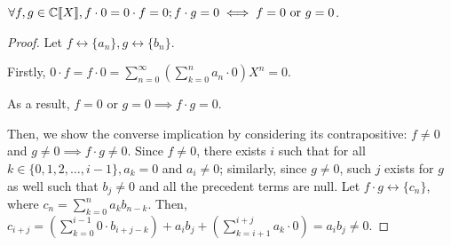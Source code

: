 \documentclass[a4paper, 12pt]{report}
\begin{document}
\begin{prop}\label{prop:gf-mult-0}
$\forall f, g \in \mathbb{C}\llbracket X\rrbracket, f \cdot 0 = 0 \cdot f = 0; f \cdot g = 0 \iff f = 0 \text{ or } g = 0$.
\end{prop}
\begin{proof}
Let $f \longleftrightarrow \{a_n\}, g \longleftrightarrow \{b_n\}$. 

Firstly, $0 \cdot f = f \cdot 0 = \sum_{n = 0}^\infty \left(\sum_{k = 0}^n a_n \cdot 0\right)X^n = 0$.

As a result, $f = 0$ or $g = 0 \implies f \cdot g = 0$.

Then, we show the converse implication by considering its contrapositive: $f \neq 0$ and $g \neq 0 \implies f \cdot g \neq 0$. Since $f \neq 0$, there exists $i$ such that for all $k \in \{0, 1, 2, \dots, i - 1\}, a_{k} = 0$ and $a_i \neq 0$; similarly, since $g \neq 0$, such $j$ exists for $g$ as well such that $b_j \neq 0$ and all the precedent terms are null. Let $f \cdot g \longleftrightarrow \{c_n\}$, where $c_n = \sum_{k = 0}^n a_k b_{n - k}$. Then, $c_{i + j} = (\sum_{k = 0}^{i - 1} 0 \cdot b_{i + j - k}) + a_i b_j + (\sum_{k = i + 1}^{i + j} a_{k} \cdot 0) = a_i b_j \neq 0$.
\end{proof}
\end{document}

